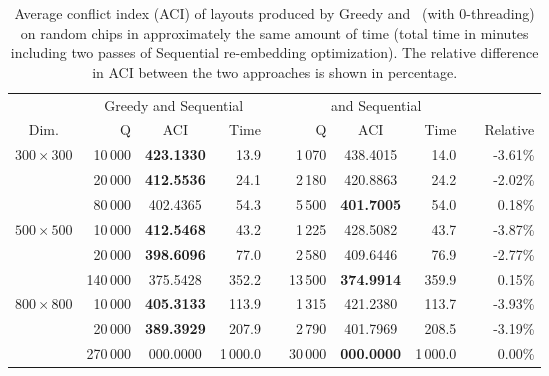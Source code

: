 \begin{table}[p!]\centering
\caption{\label{tab:greedycomp_ci}
  Average conflict index (ACI) of layouts produced by Greedy and \Greedyplus\
  (with $0$-threading) on random chips in approximately the same amount of time
  (total time in minutes including two passes of Sequential re-embedding
  optimization). The relative difference in ACI between the two approaches is
  shown in percentage.}
\footnotesize{
\begin{tabular}{crcrlrcrlr}
\vspace{1pt}
                & \multicolumn{3}{c}{Greedy and Sequential} & & \multicolumn{3}{c}{\Greedyplus\ and Sequential}   \\ \cline{2-4} \cline{6-8}
\vspace{1pt}
Dim.            & Q        & ACI            & Time     & & Q       & ACI            & Time      & & Relative \\
\hline
$300\times 300$ &  10\,000 & {\bf 423.1330} &     13.9 & &  1\,070 &      438.4015  &     14.0 &  & -3.61\% \\
                &  20\,000 & {\bf 412.5536} &     24.1 & &  2\,180 &      420.8863  &     24.2 &  & -2.02\% \\
                &  80\,000 &      402.4365  &     54.3 & &  5\,500 & {\bf 401.7005} &     54.0 &  &  0.18\% \\
\hline
$500\times 500$ &  10\,000 & {\bf 412.5468} &     43.2 & &  1\,225 &      428.5082  &     43.7 &  & -3.87\% \\
                &  20\,000 & {\bf 398.6096} &     77.0 & &  2\,580 &      409.6446  &     76.9 &  & -2.77\% \\
                & 140\,000 &      375.5428  &    352.2 & & 13\,500 & {\bf 374.9914} &    359.9 &  &  0.15\% \\
\hline
$800\times 800$ &  10\,000 & {\bf 405.3133} &    113.9 & &  1\,315 &      421.2380  &    113.7 &  & -3.93\% \\
                &  20\,000 & {\bf 389.3929} &    207.9 & &  2\,790 &      401.7969  &    208.5 &  & -3.19\% \\
                & 270\,000 &      000.0000  & 1\,000.0 & & 30\,000 & {\bf 000.0000} & 1\,000.0 &  &  0.00\% \\
\hline
\end{tabular}}
\end{table}
